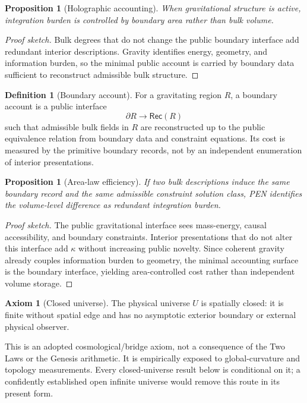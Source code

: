 \documentclass[11pt]{article}
\theoremstyle{plain}
\newtheorem{proposition}[theorem]{Proposition}
\theoremstyle{definition}
\newtheorem{definition}[theorem]{Definition}
\newtheorem{axiom}[theorem]{Axiom}
\theoremstyle{remark}
\newenvironment{proofsketch}{\begin{proof}[Proof sketch]}{\end{proof}}
\begin{document}
\begin{proposition}[Holographic accounting]
When gravitational structure is active, integration burden is controlled by boundary area rather than bulk volume.
\end{proposition}

\begin{proofsketch}
Bulk degrees that do not change the public boundary interface add redundant interior descriptions. Gravity identifies energy, geometry, and information burden, so the minimal public account is carried by boundary data sufficient to reconstruct admissible bulk structure.
\end{proofsketch}

\begin{definition}[Boundary account]
For a gravitating region \(R\), a boundary account is a public interface
\[
\partial R \longrightarrow \mathsf{Rec}(R)
\]
such that admissible bulk fields in \(R\) are reconstructed up to the public equivalence relation from boundary data and constraint equations. Its cost is measured by the primitive boundary records, not by an independent enumeration of interior presentations.
\end{definition}

\begin{proposition}[Area-law efficiency]
If two bulk descriptions induce the same boundary record and the same admissible constraint solution class, PEN identifies the volume-level difference as redundant integration burden.
\end{proposition}

\begin{proofsketch}
The public gravitational interface sees mass-energy, causal accessibility, and boundary constraints. Interior presentations that do not alter this interface add \(\kappa\) without increasing public novelty. Since coherent gravity already couples information burden to geometry, the minimal accounting surface is the boundary interface, yielding area-controlled cost rather than independent volume storage.
\end{proofsketch}

\begin{axiom}[Closed universe]
The physical universe \(U\) is spatially closed: it is finite without spatial edge and has no asymptotic exterior boundary or external physical observer.
\end{axiom}

This is an adopted cosmological/bridge axiom, not a consequence of the Two Laws or the Genesis arithmetic. It is empirically exposed to global-curvature and topology measurements. Every closed-universe result below is conditional on it; a confidently established open infinite universe would remove this route in its present form.
\end{document}
